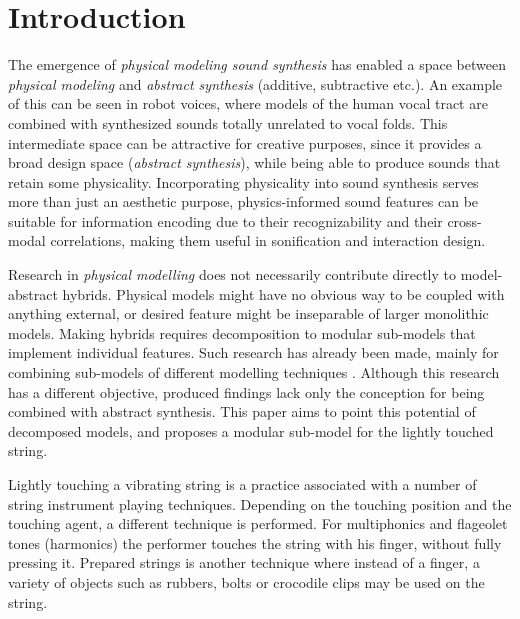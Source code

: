 \documentclass{sigchi}
\def\plainkeywords{physical modelling; audio features}
\begin{document}

\keywords{\plainkeywords}

\printccsdesc

\section{Introduction}

The emergence of \textit{physical modeling sound synthesis} has enabled a space between \textit{physical modeling} and \textit{abstract synthesis} (additive, subtractive etc.). An example of this can be seen in robot voices, where models of the human vocal tract are combined with synthesized sounds totally unrelated to vocal folds. This intermediate space can be attractive for creative purposes, since it provides a broad design space (\textit{abstract synthesis}), while being able to produce sounds that retain some physicality. Incorporating physicality into sound synthesis serves more than just an aesthetic purpose, physics-informed sound features can be suitable for information encoding due to their recognizability and their cross-modal correlations, making them useful in sonification and interaction design.

Research in \textit{physical modelling} does not necessarily contribute directly to model-abstract hybrids. Physical models might have no obvious way to be coupled with anything external, or desired feature might be inseparable of larger monolithic models. Making hybrids requires decomposition to modular sub-models that implement individual features. Such research has already been made, mainly for combining sub-models of different modelling techniques \cite{erkut_modular_2005,karjalainen_plucked-string_1998}. Although this research has a different objective, produced findings lack only the conception for being combined with abstract synthesis. This paper aims to point this potential of decomposed models, and proposes a modular sub-model for the lightly touched string.

Lightly touching a vibrating string is a practice associated with a number of string instrument playing techniques. Depending on the touching position and the touching agent, a different technique is performed. For multiphonics and flageolet tones (harmonics) the performer touches the string with his finger, without fully pressing it. Prepared strings is another technique where instead of a finger, a variety of objects such as rubbers, bolts or crocodile clips may be used on the string.
\end{document}
